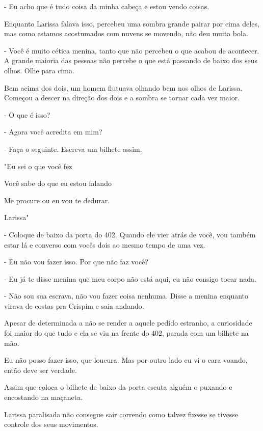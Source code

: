 - Eu acho que é tudo coisa da minha cabeça e estou vendo coisas.

Enquanto Larissa falava isso, percebeu uma sombra grande pairar por cima deles, mas como estamos acostumados com nuvens se movendo, não deu muita bola. 

- Você é muito cética menina, tanto que não percebeu o que acabou de acontecer. A grande maioria das pessoas não percebe o que está passando de baixo dos seus olhos. Olhe para cima.

Bem acima dos dois, um homem flutuava olhando bem nos olhos de Larissa. Começou a descer na direção dos dois e a sombra se tornar cada vez maior.

- O que é isso?

- Agora você acredita em mim?

- Faça o seguinte. Escreva um bilhete assim.

"Eu sei o que você fez

Você sabe do que eu estou falando

Me procure ou eu vou te dedurar.

Larissa"

- Coloque de baixo da porta do 402. Quando ele vier atrás de você, vou também estar lá e converso com vocês dois ao mesmo tempo de uma vez.

- Eu não vou fazer isso. Por que não faz você?

- Eu já te disse menina que meu corpo não está aqui, eu não consigo tocar nada.

- Não sou sua escrava, não vou fazer coisa nenhuma. Disse a menina enquanto virava de costas pra Crispim e saia andando.

Apesar de determinada a não se render a aquele pedido estranho, a curiosidade foi maior do que tudo e ela se viu na frente do 402, parada com um bilhete na mão.

Eu não posso fazer isso, que loucura. Mas por outro lado eu vi o cara voando, então deve ser verdade.

Assim que coloca o bilhete de baixo da porta escuta alguém o puxando e encostando na maçaneta.

Larissa paralisada não consegue sair correndo como talvez fizesse se tivesse controle dos seus movimentos.




